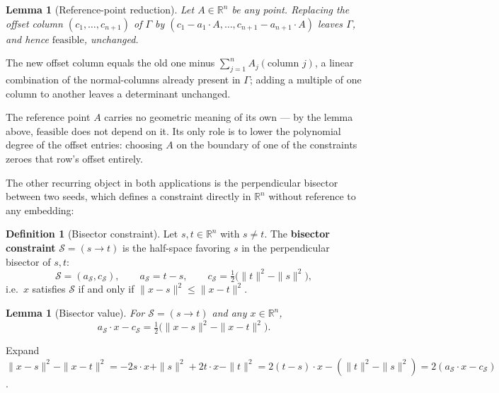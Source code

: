 \documentclass[12pt]{article}
\makeatletter
\newtheorem{lemma}[theorem]{Lemma}
\theoremstyle{definition}
\newtheorem{definition}[theorem]{Definition}
\theoremstyle{remark}
\renewenvironment{proof}[1][\proofname]{\par
  \pushQED{\qed}%
  \normalfont \footnotesize \topsep6\p@\@plus6\p@\relax
  \list{}{\leftmargin=2em
          \settowidth{\itemindent}{\itshape#1}%
          \labelwidth=\itemindent
          \parsep=0pt \listparindent=\parindent 
  }
  \item[\hskip\labelsep
        \itshape
    #1\@addpunct{.}]\ignorespaces
}{%
  \popQED\endlist\@endpefalse
}
\makeatother
\begin{document}
\begin{lemma}[Reference-point reduction]\label{lem:refpoint}
Let $A \in \mathbb{R}^n$ be any point. Replacing the offset column
$(c_1,\ldots,c_{n+1})$ of $\Gamma$ by $(c_1 - a_1\cdot A,
\ldots, c_{n+1}-a_{n+1}\cdot A)$ leaves $\Gamma$, and hence
$\mathrm{feasible}$, unchanged.
\end{lemma}
\begin{proof}
    The new offset column equals the old one minus $\sum_{j=1}^n A_j
    (\text{column } j)$, a linear combination of the normal-columns already
    present in $\Gamma$; adding a multiple of one column to another leaves a
    determinant unchanged.
\end{proof}

\noindent
The reference point $A$ carries no geometric meaning of its own --- by the
lemma above, $\mathrm{feasible}$ does not depend on it. Its only role is to
lower the polynomial degree of the offset entries: choosing $A$ on the
boundary of one of the constraints zeroes that row's offset entirely.

\bigskip
The other recurring object in both applications is the perpendicular
bisector between two seeds, which defines a constraint directly in
$\mathbb{R}^n$ without reference to any embedding:

\begin{definition}[Bisector constraint]\label{def:bisector}
Let $s,t \in \mathbb{R}^n$ with $s\neq t$. The \textbf{bisector constraint}
$\mathcal S = (s\!\to\!t)$ is the half-space favoring $s$ in the
perpendicular bisector of $s,t$:
\begin{equation*}
    \mathcal S = (a_{\mathcal S}, c_{\mathcal S}), \qquad
    a_{\mathcal S} = t-s, \qquad c_{\mathcal S} = \tfrac12\big(\|t\|^2 - \|s\|^2\big),
\end{equation*}
i.e.\ $x$ satisfies $\mathcal S$ if and only if $\|x-s\|^2 \le \|x-t\|^2$.
\end{definition}

\begin{lemma}[Bisector value]\label{lem:bisector-value}
For $\mathcal S = (s\!\to\!t)$ and any $x \in \mathbb{R}^n$,
\begin{equation*}
    a_{\mathcal S}\cdot x - c_{\mathcal S} = \tfrac12\big(\|x-s\|^2 - \|x-t\|^2\big).
\end{equation*}
\end{lemma}
\begin{proof}
    Expand $\|x-s\|^2 - \|x-t\|^2 = -2s\cdot x + \|s\|^2 + 2t\cdot x - \|t\|^2
    = 2(t-s)\cdot x - (\|t\|^2 - \|s\|^2) = 2(a_{\mathcal S}\cdot x -
    c_{\mathcal S})$.
\end{proof}
\end{document}

